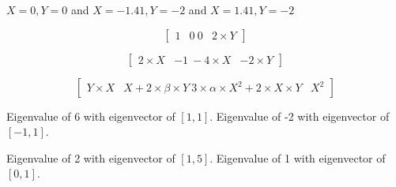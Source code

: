 \documentclass[]{memoir}
\begin{document}
$X=0, Y=0$ and $X=-1.41, Y=-2$ and $X=1.41, Y=-2$


\[
\begin{bmatrix}
1 & 0 \
0 & 2 \times Y
\end{bmatrix}
\]


\[
\begin{bmatrix}
2 \times X & -1  \
-4 \times X & -2 \times Y
\end{bmatrix}
\]


\[
\begin{bmatrix} Y \times X & X+2 \times \beta \times Y \ 3 \times \alpha \times X^2 + 2 \times X \times Y & X^2 \end{bmatrix}
\]


Eigenvalue of 6 with eigenvector of $[1,1]$. Eigenvalue of -2 with
eigenvector of $[-1,1]$.


Eigenvalue of 2 with eigenvector of $[1,5]$. Eigenvalue of 1 with
eigenvector of $[0,1]$.

\end{document}
